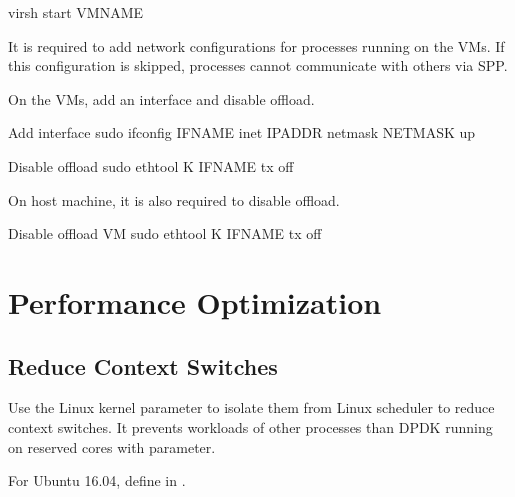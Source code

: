 \documentclass[a4paper,11pt,openany,oneside,english]{sphinxmanual}
\begin{document}
\begin{sphinxVerbatim}[commandchars=\\\{\},formatcom=\footnotesize]
 virsh start VM\PYGZus{}NAME
\end{sphinxVerbatim}

It is required to add network configurations for processes running on the VMs.
If this configuration is skipped, processes cannot communicate with others
via SPP.

On the VMs, add an interface and disable offload.

\begin{sphinxVerbatim}[commandchars=\\\{\},formatcom=\footnotesize]
 Add interface
 sudo ifconfig IF\PYGZus{}NAME inet IPADDR netmask NETMASK up

 Disable offload
 sudo ethtool \PYGZhy{}K IF\PYGZus{}NAME tx off
\end{sphinxVerbatim}

On host machine, it is also required to disable offload.

\begin{sphinxVerbatim}[commandchars=\\\{\},formatcom=\footnotesize]
 Disable offload  VM
 sudo ethtool \PYGZhy{}K IF\PYGZus{}NAME tx off
\end{sphinxVerbatim}


\section{Performance Optimization}
\label{\detokenize{gsg/performance_opt:performance-optimization}}\label{\detokenize{gsg/performance_opt:gsg-performance-opt}}\label{\detokenize{gsg/performance_opt::doc}}

\subsection{Reduce Context Switches}
\label{\detokenize{gsg/performance_opt:reduce-context-switches}}
Use the  Linux kernel parameter to isolate them
from Linux scheduler to reduce context switches.
It prevents workloads of other processes than DPDK running on
reserved cores with  parameter.

For Ubuntu 16.04, define  in .
\end{document}
